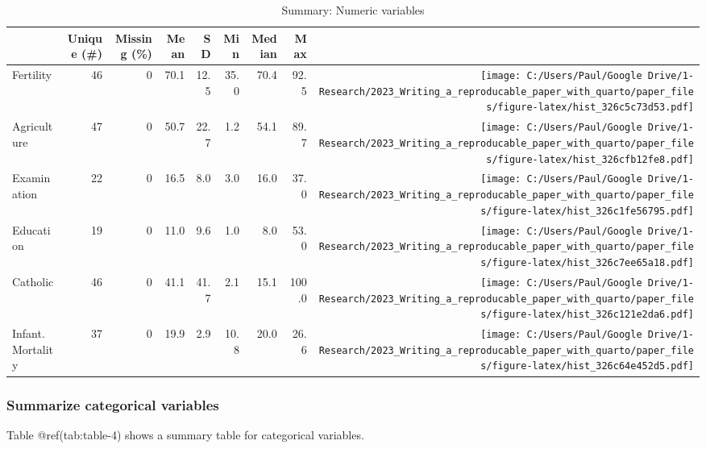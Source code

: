 \documentclass[
  letterpaper,
  DIV=11,
  numbers=noendperiod]{scrartcl}
\begin{document}
\begin{table}

\caption{Summary: Numeric variables}
\centering
\begin{tabular}[t]{lrrrrrrr>{}r}
\toprule
  & Unique (\#) & Missing (\%) & Mean & SD & Min & Median & Max &   \\
\midrule
Fertility & 46 & 0 & \num{70.1} & \num{12.5} & \num{35.0} & \num{70.4} & \num{92.5} & \texttt{[image: C:/Users/Paul/Google Drive/1-Research/2023\_Writing\_a\_reproducable\_paper\_with\_quarto/paper\_files/figure-latex/hist\_326c5c73d53.pdf]}\\
Agriculture & 47 & 0 & \num{50.7} & \num{22.7} & \num{1.2} & \num{54.1} & \num{89.7} & \texttt{[image: C:/Users/Paul/Google Drive/1-Research/2023\_Writing\_a\_reproducable\_paper\_with\_quarto/paper\_files/figure-latex/hist\_326cfb12fe8.pdf]}\\
Examination & 22 & 0 & \num{16.5} & \num{8.0} & \num{3.0} & \num{16.0} & \num{37.0} & \texttt{[image: C:/Users/Paul/Google Drive/1-Research/2023\_Writing\_a\_reproducable\_paper\_with\_quarto/paper\_files/figure-latex/hist\_326c1fe56795.pdf]}\\
Education & 19 & 0 & \num{11.0} & \num{9.6} & \num{1.0} & \num{8.0} & \num{53.0} & \texttt{[image: C:/Users/Paul/Google Drive/1-Research/2023\_Writing\_a\_reproducable\_paper\_with\_quarto/paper\_files/figure-latex/hist\_326c7ee65a18.pdf]}\\
Catholic & 46 & 0 & \num{41.1} & \num{41.7} & \num{2.1} & \num{15.1} & \num{100.0} & \texttt{[image: C:/Users/Paul/Google Drive/1-Research/2023\_Writing\_a\_reproducable\_paper\_with\_quarto/paper\_files/figure-latex/hist\_326c121e2da6.pdf]}\\
Infant.Mortality & 37 & 0 & \num{19.9} & \num{2.9} & \num{10.8} & \num{20.0} & \num{26.6} & \texttt{[image: C:/Users/Paul/Google Drive/1-Research/2023\_Writing\_a\_reproducable\_paper\_with\_quarto/paper\_files/figure-latex/hist\_326c64e452d5.pdf]}\\
\bottomrule
\end{tabular}
\end{table}

\hypertarget{summarize-categorical-variables}{%
\subsubsection{Summarize categorical
variables}\label{summarize-categorical-variables}}

Table @ref(tab:table-4) shows a summary table for categorical variables.
\end{document}
